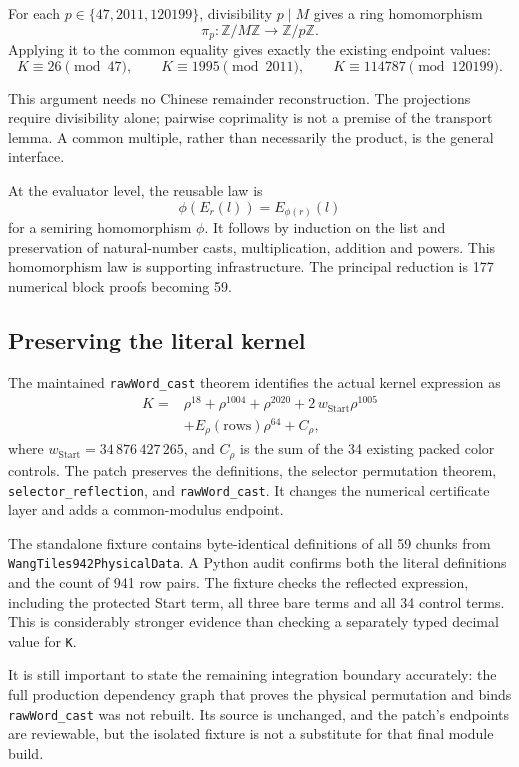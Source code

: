 \documentclass[11pt,letterpaper]{article}
\newcommand{\code}[1]{\nolinkurl{#1}}
\newcommand{\ZZ}{\mathbb Z}
\newcommand{\Zmod}[1]{\ZZ/#1\ZZ}
\begin{document}
For each \(p\in\{47,2011,120199\}\), divisibility \(p\mid M\) gives a ring homomorphism
\[
 \pi_p:\Zmod{M}\longrightarrow\Zmod{p}.
\]
Applying it to the common equality gives exactly the existing endpoint values:
\[
 K\equiv26\pmod{47},\qquad
 K\equiv1995\pmod{2011},\qquad
 K\equiv114787\pmod{120199}.
\]

This argument needs no Chinese remainder reconstruction. The projections require divisibility alone; pairwise coprimality is not a premise of the transport lemma. A common multiple, rather than necessarily the product, is the general interface.

At the evaluator level, the reusable law is
\[
 \phi(E_r(l))=E_{\phi(r)}(l)
\]
for a semiring homomorphism \(\phi\). It follows by induction on the list and preservation of natural-number casts, multiplication, addition and powers. This homomorphism law is supporting infrastructure. The principal reduction is 177 numerical block proofs becoming 59.

\subsection{Preserving the literal kernel}

The maintained \code{rawWord_cast} theorem identifies the actual kernel expression as
\begin{align*}
 K={}&\rho^{18}+\rho^{1004}+\rho^{2020}
       +2\,w_{\mathrm{Start}}\rho^{1005}\\
    &+E_\rho(\mathrm{rows})\rho^{64}+C_\rho,
\end{align*}
where \(w_{\mathrm{Start}}=34\,876\,427\,265\), and \(C_\rho\) is the sum of the 34 existing packed color controls. The patch preserves the definitions, the selector permutation theorem, \code{selector_reflection}, and \code{rawWord_cast}. It changes the numerical certificate layer and adds a common-modulus endpoint.

The standalone fixture contains byte-identical definitions of all 59 chunks from \code{WangTiles942PhysicalData}. A Python audit confirms both the literal definitions and the count of 941 row pairs. The fixture checks the reflected expression, including the protected Start term, all three bare terms and all 34 control terms. This is considerably stronger evidence than checking a separately typed decimal value for \code{K}.

It is still important to state the remaining integration boundary accurately: the full production dependency graph that proves the physical permutation and binds \code{rawWord_cast} was not rebuilt. Its source is unchanged, and the patch's endpoints are reviewable, but the isolated fixture is not a substitute for that final module build.
\end{document}
